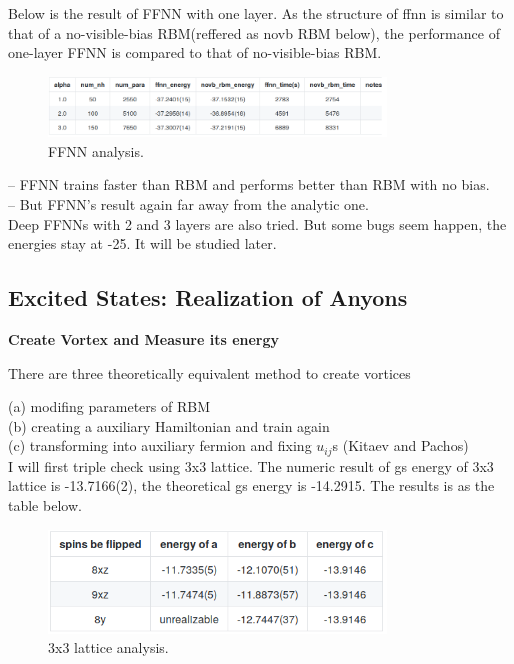 \documentclass{article}
\begin{document}
Below is the result of FFNN with one layer. As the structure of ffnn is similar to that of a no-visible-bias RBM(reffered as novb RBM below), the performance of one-layer FFNN is compared to that of no-visible-bias RBM.

\begin{figure}[!htb]
	\centering
	\includegraphics[width=0.8\textwidth]{./images/ffnn.png}
	\caption{\label{tab:ffnn} FFNN analysis.} 
\end{figure}    

    -- FFNN trains faster than RBM and performs better than RBM with no bias.\\
    -- But FFNN's result again far away from the analytic one. \\

Deep FFNNs with 2 and 3 layers are also tried. But some bugs seem happen, the energies stay at -25. It will be studied later.

\subsection{Excited States: Realization of Anyons}

\textbf{Create Vortex and Measure its energy}

There are three theoretically equivalent method to create vortices

    (a) modifing parameters of RBM \\
    (b) creating a auxiliary Hamiltonian and train again \\
    (c) transforming into auxiliary fermion and fixing $u_{ij}$s (Kitaev and Pachos) \\
    
I will first triple check using 3x3 lattice. The numeric result of gs energy of 3x3 lattice is -13.7166(2), the theoretical gs energy is -14.2915. The results is as the table below.

\begin{figure}[!htb]
	\centering
	\includegraphics[width=0.8\textwidth]{./images/3x3.png}
	\caption{\label{tab:3x3} 3x3 lattice analysis.} 
\end{figure}
\end{document}
